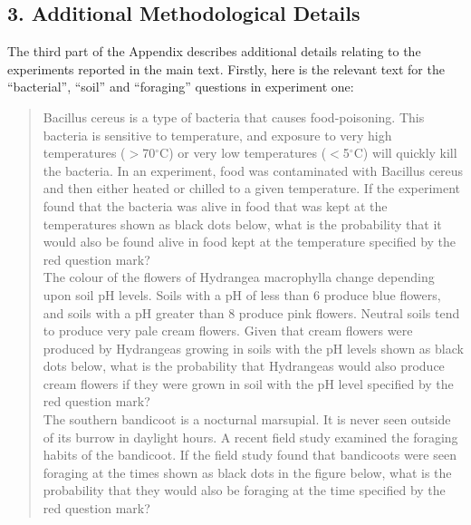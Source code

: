 \documentclass[doc]{apa6}
\begin{document}
\vspace*{6pt}
\subsection{3. Additional Methodological Details}

The third part of the Appendix describes additional details relating to the experiments reported in the main text. Firstly, here is the relevant text for the ``bacterial'', ``soil'' and ``foraging'' questions in experiment one:

 \vspace*{-3pt}
\begin{quotation} \footnotesize \linespread{.5}
\noindent\textsf{{Bacillus cereus} is a type of bacteria that causes food-poisoning. This bacteria is sensitive to temperature, and exposure to very high temperatures ($>$70$^\circ$C) or very low temperatures ($<$5$^\circ$C) will quickly kill the bacteria. In an experiment, food was contaminated with {Bacillus cereus} and then either heated or chilled to a given temperature. If the experiment found that the bacteria was alive in food that was kept at the temperatures shown as black dots below, what is the probability that it would also be found alive in food kept at the temperature specified by the red question mark?
\vspace*{9pt} \\
\noindent The colour of the flowers of Hydrangea macrophylla change depending upon soil pH levels. Soils with a pH of less than 6 produce blue flowers, and soils with a pH greater than 8 produce pink flowers. Neutral soils tend to produce very pale cream flowers. Given that cream flowers were produced by Hydrangeas growing in soils with the pH levels shown as black dots below, what is the probability that Hydrangeas would also produce cream flowers if they were grown in soil with the pH level specified by the red question mark?
\vspace*{9pt} \\
\noindent The southern bandicoot is a nocturnal marsupial. It is never seen outside of its burrow in daylight hours. A recent field study examined the foraging habits of the bandicoot. If the field study found that bandicoots were seen foraging at the times shown as black dots in the figure below, what is the probability that they would also be foraging at the time specified by the red question mark?
}\normalsize \end{quotation}\vspace*{-4pt}
\end{document}
